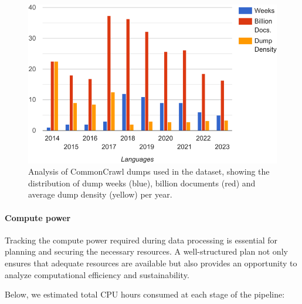 




\begin{figure}
\centering
  \centering
  \includegraphics[width=0.75\linewidth]{images/Analysis/docs_weeks_density_xyear.pdf}
\caption{Analysis of CommonCrawl dumps used in the dataset, showing the distribution of dump weeks (blue), billion documents (red) and average dump density (yellow) per year.}
\label{fig:dumps_distribution}
\end{figure}



\paragraph{Compute power}

Tracking the compute power required during data processing is essential for planning and securing the necessary resources. A well-structured plan not only ensures that adequate resources are available but also provides an opportunity to analyze computational efficiency and sustainability.

Below, we estimated total CPU hours consumed at each stage of the pipeline:


